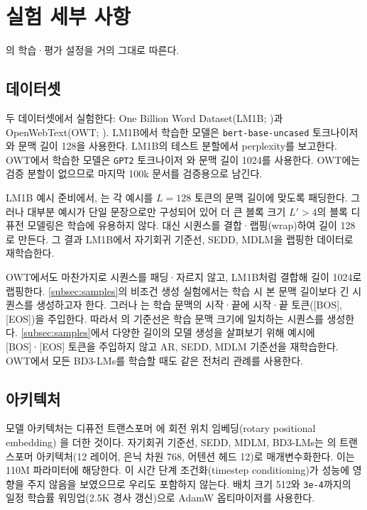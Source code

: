 \documentclass{article} %
\def\algos{BD3-LMs}
\begin{document}
\section{실험 세부 사항}
\label{suppl:details}
\citet{sahoo2024simple}의 학습·평가 설정을 거의 그대로 따른다.

\subsection{데이터셋}
\label{suppl:datasets}
두 데이터셋에서 실험한다: One Billion Word Dataset(LM1B; \citet{chelba2014billion})과 OpenWebText(OWT; \citet{Gokaslan2019OpenWeb}). LM1B에서 학습한 모델은 \texttt{bert-base-uncased} 토크나이저와 문맥 길이 128을 사용한다. LM1B의 테스트 분할에서 perplexity를 보고한다. OWT에서 학습한 모델은 \texttt{GPT2} 토크나이저 \citet{radford2019language}와 문맥 길이 1024를 사용한다. OWT에는 검증 분할이 없으므로 마지막 100k 문서를 검증용으로 남긴다.

LM1B 예시 준비에서, \citet{sahoo2024simple}는 각 예시를 $L=128$ 토큰의 문맥 길이에 맞도록 패딩한다. 그러나 대부분 예시가 단일 문장으로만 구성되어 있어 더 큰 블록 크기 $L'>4$의 블록 디퓨전 모델링은 학습에 유용하지 않다. 대신 시퀀스를 결합·랩핑(wrap)하여 길이 128로 만든다. 그 결과 LM1B에서 자기회귀 기준선, SEDD, MDLM을 랩핑한 데이터로 재학습한다.

OWT에서도 마찬가지로 시퀀스를 패딩·자르지 않고, LM1B처럼 결합해 길이 1024로 랩핑한다. \cref{subsec:samples}의 비조건 생성 실험에서는 학습 시 본 문맥 길이보다 긴 시퀀스를 생성하고자 한다. 그러나 \citet{sahoo2024simple}는 학습 문맥의 시작·끝에 시작·끝 토큰([BOS], [EOS])을 주입한다. 따라서 \citet{sahoo2024simple}의 기준선은 학습 문맥 크기에 일치하는 시퀀스를 생성한다. \cref{subsec:samples}에서 다양한 길이의 모델 생성을 살펴보기 위해 예시에 [BOS]·[EOS] 토큰을 주입하지 않고 AR, SEDD, MDLM 기준선을 재학습한다. OWT에서 모든 \algos{}를 학습할 때도 같은 전처리 관례를 사용한다.

\subsection{아키텍처}
\label{suppl:arch}
모델 아키텍처는 디퓨전 트랜스포머 \citep{peebles2023scalable}에 회전 위치 임베딩(rotary positional embedding) \citep{su2021roformer}을 더한 것이다. 자기회귀 기준선, SEDD, MDLM, \algos{}는 \citet{sahoo2024simple}의 트랜스포머 아키텍처(12 레이어, 은닉 차원 768, 어텐션 헤드 12)로 매개변수화한다. 이는 110M 파라미터에 해당한다. \citet{sahoo2024simple}이 시간 단계 조건화(timestep conditioning)가 성능에 영향을 주지 않음을 보였으므로 우리도 포함하지 않는다. 배치 크기 512와 \texttt{3e-4}까지의 일정 학습률 워밍업(2.5K 경사 갱신)으로 AdamW 옵티마이저를 사용한다.
\end{document}
